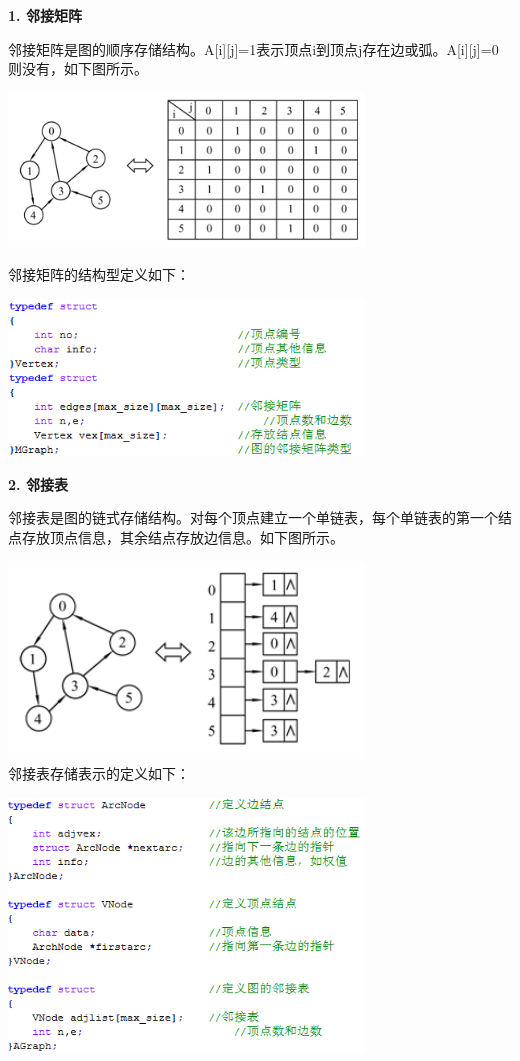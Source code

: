 {\textbf{1. 邻接矩阵}}

{邻接矩阵是图的顺序存储结构。A{[}i{]}{[}j{]}=1表示顶点i到顶点j存在边或弧。A{[}i{]}{[}j{]}=0则没有，}{如下图所示。}

{\includegraphics[width=3.71875in,height=1.60417in]{png-jpeg-pics/56BEF531A2AC657890949C5D11585A83.png}\\
}

{邻接矩阵的结构型定义如下：}{}{}{~}

\includegraphics[width=3.70833in,height=1.63542in]{png-jpeg-pics/4FD252811BCF77D0A40599876B04AFB9.png}

{\textbf{2. 邻接表}}

{邻接表是图的链式存储结构。对每个顶点建立一个单链表，每个单链表的第一个结点存放顶点信息，其余结点存放边信息。如下图所示。}

{\includegraphics[width=3.70833in,height=2.06250in]{png-jpeg-pics/9403C7B366EB7BD65BE09160658072C6.png}\\
}{邻接表存储表示的定义如下：}

\includegraphics[width=3.70833in,height=2.65625in]{png-jpeg-pics/FBBDB091E668B536041132EA0D998D47.png}
